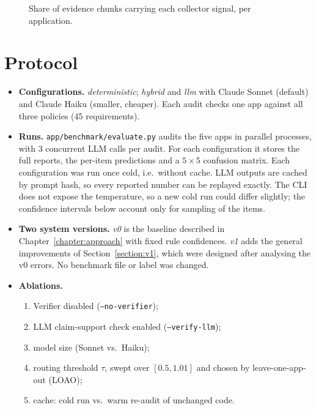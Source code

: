 \begin{figure}[htbp]
\centering
{}
\caption{Share of evidence chunks carrying each collector signal, per application.}
\label{fig:eda-signals}
\end{figure}


\section{Protocol}
\label{section:protocol}

\begin{itemize}[leftmargin=*]
  \item \textbf{Configurations.} \emph{deterministic}; \emph{hybrid} and \emph{llm} with Claude Sonnet (default) and
        Claude Haiku (smaller, cheaper). Each audit checks one app against all three policies (45 requirements).
  \item \textbf{Runs.} \texttt{app/benchmark/evaluate.py} audits the five apps in parallel processes, with 3 concurrent
        LLM calls per audit. For each configuration it stores the full reports, the per-item predictions and a
        $5\times5$ confusion matrix. Each configuration was run once cold, i.e.\ without cache. LLM outputs are cached by
        prompt hash, so every reported number can be replayed exactly. The CLI does not expose the temperature, so a
        new cold run could differ slightly; the confidence intervals below account only for sampling of the items.
  \item \textbf{Two system versions.} \emph{v0} is the baseline described in Chapter~\ref{chapter:approach} with fixed
        rule confidences. \emph{v1} adds the general improvements of Section~\ref{section:v1}, which were designed after
        analysing the v0 errors. No benchmark file or label was changed.
  \item \textbf{Ablations.}
        \begin{enumerate}[label=(\alph*), leftmargin=*]
          \item Verifier disabled (\texttt{--no-verifier});
          \item LLM claim-support check enabled (\texttt{--verify-llm});
          \item model size (Sonnet vs.\ Haiku);
          \item routing threshold $\tau$, swept over $[0.5, 1.01]$ and chosen by leave-one-app-out (LOAO);
          \item cache: cold run vs.\ warm re-audit of unchanged code.

\end{enumerate}
\end{itemize}
